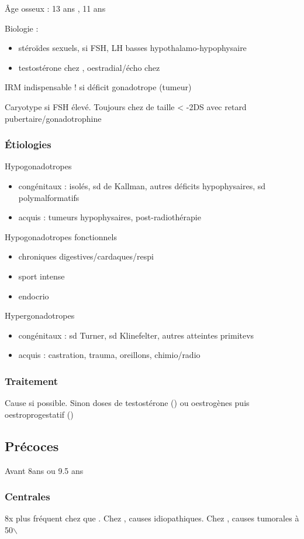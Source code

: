 \documentclass[11pt]{article}
\begin{document}
Âge osseux : 13 ans \male, 11 ans \female

Biologie : 
\begin{itemize}
\item stéroïdes sexuels, si FSH, LH basses \thus hypothalamo-hypophysaire
\item testostérone chez \male, oestradial/écho chez \female
\end{itemize}

IRM indispensable ! si déficit gonadotrope (tumeur)

Caryotype si FSH élevé. Toujours chez \female de taille < -2DS avec retard
pubertaire/gonadotrophine \inc

\subsubsection{Étiologies}
\label{sec:orga9a4326}
Hypogonadotropes
\begin{itemize}
\item congénitaux : isolés, sd de Kallman, autres déficits hypophysaires, sd
polymalformatifs
\item acquis : tumeurs hypophysaires, post-radiothérapie
\end{itemize}
Hypogonadotropes fonctionnels
\begin{itemize}
\item chroniques digestives/cardaques/respi
\item sport intense
\item endocrio
\end{itemize}
Hypergonadotropes
\begin{itemize}
\item congénitaux : sd Turner, sd Klinefelter, autres atteintes primitevs
\item acquis : castration, trauma, oreillons, chimio/radio
\end{itemize}

\subsubsection{Traitement}
\label{sec:org0ec944c}
Cause si possible. Sinon doses \inc de testostérone (\male) ou oestrogènes puis
oestroprogestatif (\female)
\subsection{Précoces}
\label{sec:orgb03d64f}
Avant 8ans \female ou 9.5 ans \male
\subsubsection{Centrales}
\label{sec:org8a08cd4}
8x plus fréquent chez \female que \male. Chez \female, causes
idiopathiques. Chez \male, causes tumorales à 50$\backslash$%
\end{document}
